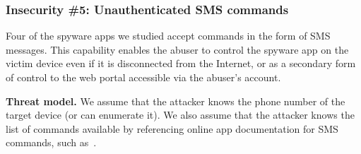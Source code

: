 \documentclass[sigconf,balance=false]{acmart}
\newcommand{\sumanth}[1]{\textcolor{violet}{\noindent[SR: #1]}}
\newcommand{\damon}[1]{\textcolor{blue}{\noindent[DM: #1]}}
\newcommand{\geoff}[1]{\textcolor{purple}{\noindent[GV: #1]}}
\newcommand{\sumanth}[1]{}
\newcommand{\geoff}[1]{}
\newcommand{\damon}[1]{}
\begin{document}




\subsubsection*{Insecurity \#5: Unauthenticated SMS commands}

Four of the spyware apps we studied accept commands in
the form of SMS messages.  This capability enables the abuser to
control the spyware app on the victim device even if it is
disconnected from the Internet, or as a secondary form of control to
the web portal accessible via the abuser's account.

\textbf{Threat model.} We assume that the attacker knows the phone
number of the target device (or can enumerate it). We also assume that
the attacker knows the list of commands available by referencing online
app documentation for SMS commands, such as~\cite{SpappSMSCommands:online,
  FlexispySMSCommands:online}.
\end{document}
